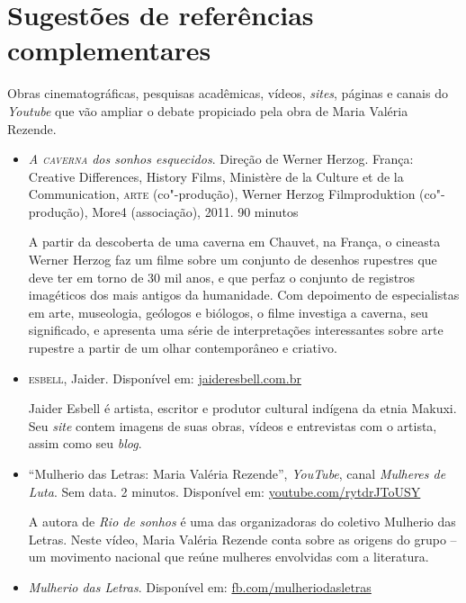 \documentclass[12pt]{extarticle}
\begin{document}
\section{Sugestões de referências complementares}

Obras cinematográficas, pesquisas acadêmicas, vídeos,
\emph{sites}, páginas e canais do \emph{Youtube} que vão ampliar o
debate propiciado pela obra de Maria Valéria Rezende.

\begin{itemize}

\item    \emph{A \textsc{caverna} dos sonhos esquecidos}. Direção de Werner Herzog.
    França: Creative Differences, History Films, Ministère de la Culture
    et de la Communication, \textsc{arte} (co"-produção), Werner Herzog
    Filmproduktion (co"-produção), More4 (associação), 2011. 90 minutos

    A partir da descoberta de uma caverna em Chauvet, na França, o
    cineasta Werner Herzog faz um filme sobre um conjunto de desenhos
    rupestres que deve ter em torno de 30 mil anos, e que perfaz o
    conjunto de registros imagéticos dos mais antigos da humanidade. Com
    depoimento de especialistas em arte, museologia, geólogos e
    biólogos, o filme investiga a caverna, seu significado, e apresenta
    uma série de interpretações interessantes sobre arte rupestre a
    partir de um olhar contemporâneo e criativo.

  \item
    \textsc{esbell}, Jaider. Disponível em:
    \href{http://www.jaideresbell.com.br/site/}{jaideresbell.com.br}

    Jaider Esbell é artista, escritor e produtor cultural indígena da
    etnia Makuxi. Seu \emph{site} contem imagens de suas obras, vídeos e
    entrevistas com o artista, assim como seu \emph{blog}.

\item    ``Mulherio das Letras: Maria Valéria Rezende'', \emph{YouTube},
    canal \emph{Mulheres de Luta}. Sem data. 2 minutos. Disponível em:
    \href{https://www.youtube.com/watch?v=rytdrJToUSY\&feature=emb_logo}{youtube.com/rytdrJToUSY}

    A autora de \emph{Rio de sonhos} é uma das organizadoras do coletivo
    Mulherio das Letras. Neste vídeo, Maria Valéria Rezende conta sobre
    as origens do grupo -- um movimento nacional que reúne mulheres
    envolvidas com a literatura.

\item    \emph{Mulherio das Letras}. Disponível em:
    \href{https://pt-br.facebook.com/mulheriodasletras/}{fb.com/mulheriodasletras}


\end{itemize}
\end{document}
